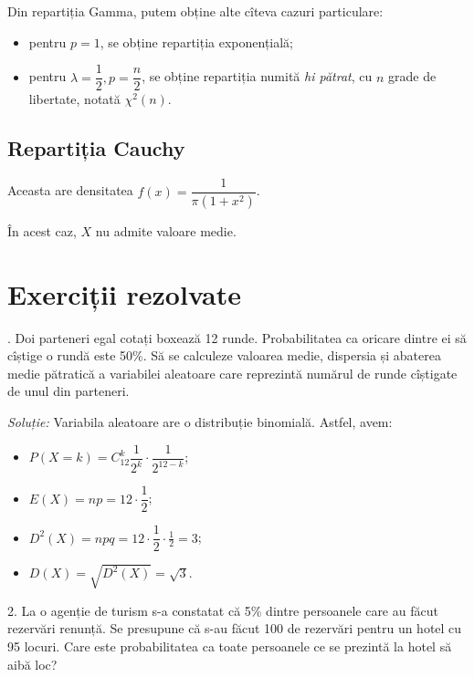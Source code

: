 Din repartiția Gamma, putem obține alte cîteva cazuri particulare:
\begin{itemize}
\item pentru $ p = 1 $, se obține repartiția exponențială;
\item pentru $ \lambda = \dfrac{1}{2}, p = \dfrac{n}{2} $, se obține
  repartiția numită \emph{hi pătrat}, cu $ n $ grade de libertate,
  notată $ \chi^2(n) $.
\end{itemize}


\subsection{Repartiția Cauchy}

\indent\indent Aceasta are densitatea $ f(x) = \dfrac{1}{\pi(1 + x^2)} $.

În acest caz, $ X $ nu admite valoare medie.

\section{Exerciții rezolvate}

\indent{}. Doi parteneri egal cotați boxează 12 runde. Probabilitatea
ca oricare dintre ei să cîștige o rundă este 50\%. Să se calculeze valoarea
medie, dispersia și abaterea medie pătratică a variabilei aleatoare care
reprezintă numărul de runde cîștigate de unul din parteneri.

\emph{Soluție:} Variabila aleatoare are o distribuție binomială.
Astfel, avem:
\begin{itemize}
\item $ P(X = k) = C_{12}^k \dfrac{1}{2^k} \cdot \dfrac{1}{2^{12-k}} $;
\item $ E(X) = np = 12 \cdot \dfrac{1}{2} $;
\item $ D^2(X) = npq = 12 \cdot \dfrac{1}{2} \cdot \frac{1}{2} = 3 $;
\item $ D(X) = \sqrt{D^2(X)} = \sqrt{3} $.
\end{itemize}

\vspace{0.3cm}

2. La o agenție de turism s-a constatat că 5\% dintre persoanele care au făcut
rezervări renunță. Se presupune că s-au făcut 100 de rezervări pentru un hotel cu
95 locuri. Care este probabilitatea ca toate persoanele ce se prezintă la hotel
să aibă loc?

